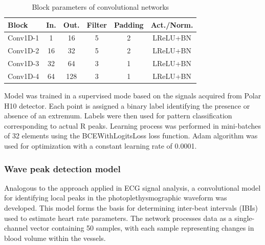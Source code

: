 \documentclass{citask}
\begin{document}
\begin{table}[h!]
\centering
\caption{Block parameters of convolutional networks}
\label{tab:ecg_layers}
\begin{tabular}{|l|c|c|c|c|c|}
\hline
\textbf{Block} & \textbf{In.} & \textbf{Out.} & \textbf{Filter} & \textbf{Padding} & \textbf{Act./Norm.} \\
\hline
Conv1D-1 & 1   & 16  & 5 & 2 & LReLU+BN \\
Conv1D-2 & 16  & 32  & 5 & 2 & LReLU+BN \\
Conv1D-3 & 32  & 64  & 3 & 1 & LReLU+BN \\
Conv1D-4 & 64  & 128 & 3 & 1 & LReLU+BN \\
\hline
\end{tabular}
\end{table}

Model was trained in a supervised mode based on the signals acquired from Polar H10 detector. Each point is assigned a binary label identifying the presence or absence of an extremum. Labels were then used for pattern classification corresponding to actual R peaks.
Learning process was performed in mini-batches of 32 elements using the BCEWithLogitsLoss loss function. Adam algorithm was used for optimization with a constant learning rate of 0.0001. 

\subsubsection{Wave peak detection model}
Analogous to the approach applied in ECG signal analysis, a convolutional model for identifying local peaks in the photoplethysmographic waveform was developed. This model forms the basis for determining inter-beat intervals (IBIs) used to estimate heart rate parameters. The network processes data as a single-channel vector containing 50 samples, with each sample representing changes in blood volume within the vessels.
\end{document}
